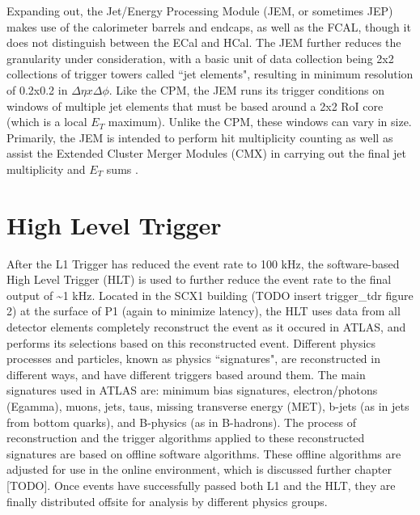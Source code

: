     Expanding out, the Jet/Energy Processing Module (JEM, or sometimes JEP) makes use of the calorimeter barrels and endcaps, as well as the FCAL, though it does not distinguish between the ECal and HCal.
    The JEM further reduces the granularity under consideration, with a basic unit of data collection being 2x2 collections of trigger towers called ``jet elements", resulting in minimum resolution of 0.2x0.2 in $\Delta \eta x \Delta \phi$.
    Like the CPM, the JEM runs its trigger conditions on windows of multiple jet elements that must be based around a 2x2 RoI core (which is a local $E_T$ maximum).
    Unlike the CPM, these windows can vary in size.
    Primarily, the JEM is intended to perform hit multiplicity counting as well as assist the Extended Cluster Merger Modules (CMX) in carrying out the final jet multiplicity and $E_T$ sums \cite{L1_calo_run1}\cite{trigger_run2}.


\section{High Level Trigger}
    After the L1 Trigger has reduced the event rate to 100 kHz, the software-based High Level Trigger (HLT) is used to further reduce the event rate to the final output of \textasciitilde 1 kHz.
    Located in the SCX1 building (TODO insert trigger_tdr figure 2) at the surface of P1 (again to minimize latency), the HLT uses data from all detector elements completely reconstruct the event as it occured in ATLAS, and performs its selections based on this reconstructed event.
    Different physics processes and particles, known as physics ``signatures", are reconstructed in different ways, and have different triggers based around them. 
    The main signatures used in ATLAS are: minimum bias signatures, electron/photons (Egamma), muons, jets, taus, missing transverse energy (MET), b-jets (as in jets from bottom quarks), and B-physics (as in B-hadrons).
    The process of reconstruction and the trigger algorithms applied to these reconstructed signatures are based on offline software algorithms.
    These offline algorithms are adjusted for use in the online environment, which is discussed further chapter [TODO].
    Once events have successfully passed both L1 and the HLT, they are finally distributed offsite for analysis by different physics groups.
    
    

